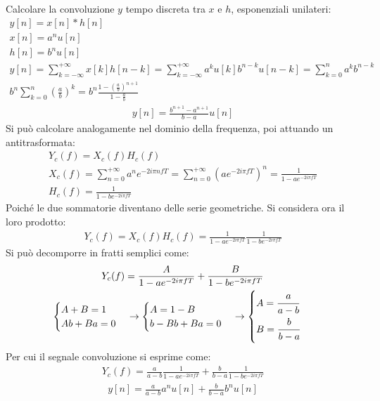 \documentclass{article}
\begin{document}
Calcolare la convoluzione $y$ tempo discreta tra $x$ e $h$, esponenziali unilateri: 
\begin{gather*}
    y[n]=x[n]*h[n]\\
    x[n]=a^nu[n]\\
    h[n]=b^nu[n]\\
    y[n]=\displaystyle\sum_{k=-\infty}^{+\infty}x[k]h[n-k]=\sum_{k=-\infty}^{+\infty}a^ku[k]b^{n-k}u[n-k]=\sum_{k=0}^na^kb^{n-k}\\
    \displaystyle b^n\sum_{k=0}^n\left(\frac{a}{b}\right)^k=b^n\frac{1-\left(\frac{a}{b}\right)^{n+1}}{1-\frac{a}{b}}
\end{gather*}
\begin{gather}
    y[n]=\displaystyle\frac{b^{n+1}-a^{n+1}}{b-a}u[n]
\end{gather}
Si può calcolare analogamente nel dominio della frequenza, poi attuando un antitrasformata: 
\begin{gather*}
    Y_c(f)=X_c(f)H_c(f)\\
    X_c(f)=\displaystyle\sum_{n=0}^{+\infty}a^ne^{-2i\pi nfT}=\sum_{n=0}^{+\infty}\left(ae^{-2i\pi fT}\right)^n=\frac{1}{1-ae^{-2i\pi fT}}\\
    H_c(f)=\displaystyle\frac{1}{1-be^{-2i\pi fT}}
\end{gather*}
Poiché le due sommatorie diventano delle serie geometriche. Si considera ora il loro prodotto:
\begin{gather*}
    Y_c(f)=X_c(f)H_c(f)=\displaystyle\frac{1}{1-ae^{-2i\pi fT}}\frac{1}{1-be^{-2i\pi fT}}
\end{gather*}
Si può decomporre in fratti semplici come:
\begin{gather*}
    Y_c(f)=\displaystyle\frac{A}{1-ae^{-2i\pi fT}}+\frac{B}{1-be^{-2i\pi fT}}\\
    \begin{cases}
        A+B=1\\
        Ab+Ba=0
    \end{cases}\to
    \begin{cases}
        A=1-B\\
        b-Bb+Ba=0
    \end{cases}\to\begin{cases}
        A=\displaystyle\frac{\strut a}{\strut a-b}\\
        B=\displaystyle\frac{\strut b}{\strut b-a}
    \end{cases}
\end{gather*}
Per cui il segnale convoluzione si esprime come:
\begin{gather*}
    Y_c(f)=\displaystyle\frac{a}{a-b}\frac{1}{1-ae^{-2i\pi fT}}+\frac{b}{b-a}\frac{1}{1-be^{-2i\pi fT}}
\end{gather*}
\begin{gather}
    y[n]=\displaystyle\frac{a}{a-b}a^nu[n]+\displaystyle\frac{b}{b-a}b^nu[n]
\end{gather}
\end{document}
